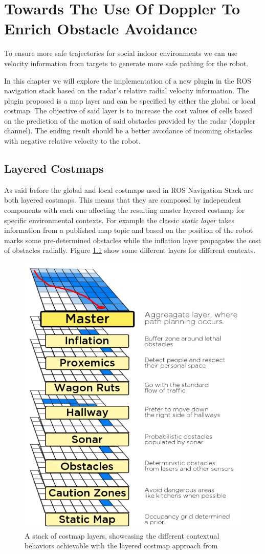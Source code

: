 \chapter{Towards The Use Of Doppler To Enrich Obstacle Avoidance}
To ensure more safe trajectories for social indoor environments we can use velocity information from targets to generate more safe pathing for  the robot. 

In this chapter we will explore the implementation of a new plugin in the ROS navigation stack based on the radar's relative radial velocity information. The plugin proposed is a map layer and can be specified by either the global or local costmap. The objective of said layer is to increase the cost values of cells based on the prediction of the motion of said obstacles provided by the radar (doppler channel). The ending result should be a better avoidance of incoming obstacles with negative relative velocity  to the robot.

\section{Layered Costmaps}
As said before the global and local costmaps used in \ac{ROS} Navigation Stack are both layered costmaps.
This means that they are composed by independent components with each one affecting the resulting master layered costmap for specific environmental contexts. For example the classic \textit{static layer} takes information from a published map topic and based on the position of the robot marks some  pre-determined obstacles while the inflation layer propagates the cost of obstacles radially.  Figure \ref{fig::layers} show some different layers for different contexts.
\begin{figure}[ht!] 
\centerline{\includegraphics [width=0.5 \textwidth]{imgs/chapter6/layers.png}}
\caption[A stack of costmap layers]{A stack of costmap layers, showcasing the different contextual
behaviors achievable with the layered costmap approach from \cite{lu2014layered}}
\label{fig::layers}
\end{figure}

